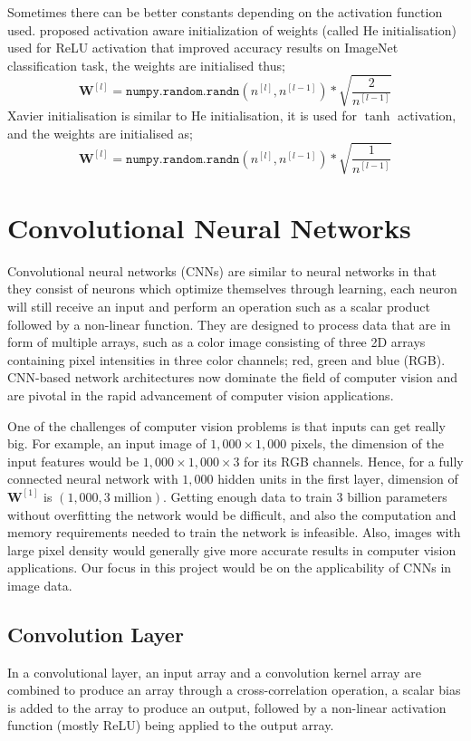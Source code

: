 \documentclass[12pt]{report}
\numberwithin{equation}{section}
\begin{document}
Sometimes there can be better constants depending on the activation function used. {\cite{10.1109/ICCV.2015.123}} proposed activation aware initialization of weights (called He initialisation) used for ReLU activation that improved accuracy results on ImageNet classification task, the weights are initialised thus;
\[
\bm{W}^{[l]} = \texttt{numpy.random.randn}(n^{[l]},n^{[l-1]}) * \sqrt{\frac{2}{n^{[l-1]}}}
\]
Xavier initialisation is similar to He initialisation, it is used for $\tanh$ activation, and the weights are initialised as;
\[
\bm{W}^{[l]} = \texttt{numpy.random.randn}(n^{[l]},n^{[l-1]}) * \sqrt{\frac{1}{n^{[l-1]}}}
\]

\section{Convolutional Neural Networks}
Convolutional neural networks (CNNs) are similar to neural networks in that they consist of neurons which optimize themselves through learning, each neuron will still receive an input and perform an operation such as a scalar product followed by a non-linear function. They are designed to process data that are in form of multiple arrays, such as a color image consisting of three 2D arrays containing pixel intensities in three color channels; red, green and blue (RGB). CNN-based network architectures now dominate the field of computer vision and are pivotal in the rapid advancement of computer vision applications.

One of the challenges of computer vision problems is that inputs can get really big. For example, an input image of $1,000\times 1,000$ pixels, the dimension of the input features would be $1,000\times 1,000\times 3$ for its RGB channels. Hence, for a fully connected neural network with $1,000$  hidden units in the first layer, dimension of $\bm{W}^{[1]}$ is $(1,000,3\;\text{million})$. Getting enough data to train $3$ billion parameters without overfitting the network would be difficult, and also the computation and memory requirements needed to train the network is infeasible. Also, images with large pixel density would generally give more accurate results in computer vision applications. Our focus in this project would be on the applicability of CNNs in image data.

\subsection{Convolution Layer} \label{subsec:conv_layer}
In a convolutional layer, an input array and a convolution kernel array are combined to produce an array through a cross-correlation operation, a scalar bias is added to the array to produce an output, followed by a non-linear activation function (mostly ReLU) being applied to the output array. 
\end{document}
